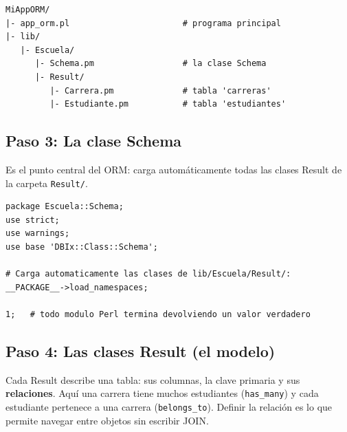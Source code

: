 \documentclass[11pt]{article}
\begin{document}
\begin{cajacodigo}
\begin{lstlisting}[style=markup]
MiAppORM/
|- app_orm.pl                       # programa principal
|- lib/
   |- Escuela/
      |- Schema.pm                  # la clase Schema
      |- Result/
         |- Carrera.pm              # tabla 'carreras'
         |- Estudiante.pm           # tabla 'estudiantes'
\end{lstlisting}
\end{cajacodigo}
\vspace{2pt}
\subsection{Paso 3: La clase Schema}
Es el punto central del ORM: carga automáticamente todas las clases Result de la carpeta \texttt{Result/}.

\begin{cajacodigo}
\begin{lstlisting}[style=perl]
package Escuela::Schema;
use strict;
use warnings;
use base 'DBIx::Class::Schema';

# Carga automaticamente las clases de lib/Escuela/Result/:
__PACKAGE__->load_namespaces;

1;   # todo modulo Perl termina devolviendo un valor verdadero
\end{lstlisting}
\end{cajacodigo}
\vspace{2pt}
\subsection{Paso 4: Las clases Result (el modelo)}
Cada Result describe una tabla: sus columnas, la clave primaria y sus \textbf{relaciones}. Aquí una carrera tiene muchos estudiantes (\texttt{has\_many}) y cada estudiante pertenece a una carrera (\texttt{belongs\_to}). Definir la relación es lo que permite navegar entre objetos sin escribir JOIN.
\end{document}
